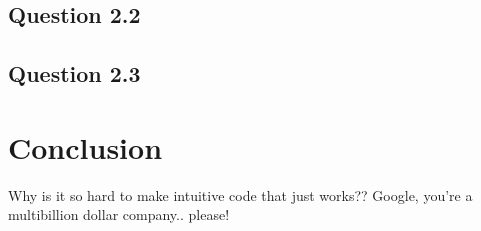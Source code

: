 \documentclass[a4paper, article, oneside, USenglish, IN5460]{memoir}
\begin{document}
\section{Question 2.2}


\section{Question 2.3}


\chapter{Conclusion}

Why is it so hard to make intuitive code that just works?? Google, you're a multibillion dollar company.. please! 
\newpage

\nocite{tensorflow2015-whitepaper}
\nocite{dataset}

\printbibliography{}

\vspace*{10mm}
\end{document}
